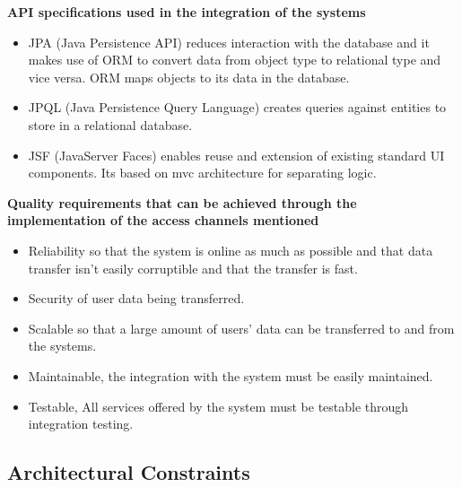 \documentclass[a4paper]{article}
\begin{document}
\textbf{API specifications used in the integration of the systems}
\begin{itemize}
	\item JPA (Java Persistence API) reduces interaction with the database and it makes use of ORM to convert data from object type to relational type and vice versa. ORM maps objects to its data in the database.
	\item JPQL (Java Persistence Query Language) creates queries against entities to store in a relational database.
	\item JSF (JavaServer Faces) enables reuse and extension of existing standard UI components. Its based on mvc architecture for separating logic.
\end{itemize}
\textbf{Quality requirements that can be achieved through the implementation of the access channels mentioned}
\begin{itemize}
	\item Reliability so that the system is online as much as possible and that data transfer isn’t easily corruptible and that the transfer is fast.
	\item Security of user data being transferred.
	\item Scalable so that a large amount of users’ data can be transferred to and from the systems.
	\item Maintainable, the integration with the system must be easily maintained.
	\item Testable, All services offered by the system must be testable through integration testing.
\end{itemize}

\subsection{Architectural Constraints}
\end{document}
